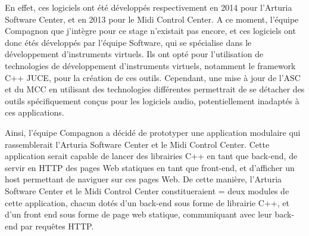\documentclass[francais]{rapportPFE}  %
\begin{document}
En effet, ces logiciels ont été développés respectivement en 2014 pour l'Arturia Software Center, et en 2013 pour le Midi Control Center. A ce moment, l'équipe Compagnon que j'intègre pour ce stage n'existait pas encore, et ces logiciels ont donc étés développés par l'équipe Software, qui se spécialise dans le développement d'instruments virtuels. Ils ont opté pour l'utilisation de technologies de développement d'instruments virtuels, notamment le framework C++ JUCE, pour la création de ces outils. Cependant, une mise à jour de l'ASC et du MCC en utilisant des technologies différentes permettrait de se détacher des outils spécifiquement conçus pour les logiciels audio, potentiellement inadaptés à ces applications.

Ainsi, l'équipe Compagnon a décidé de prototyper une application modulaire qui rassemblerait l'Arturia Software Center et le Midi Control Center. Cette application serait capable de lancer des librairies C++ en tant que back-end, de servir en HTTP des pages Web statiques en tant que front-end, et d'afficher un host permettant de naviguer sur ces pages Web. De cette manière, l'Arturia Software Center et le Midi Control Center constitueraient = deux modules de cette application, chacun dotés d'un back-end sous forme de librairie C++, et d'un front end sous forme de page web statique, communiquant avec leur back-end par requêtes HTTP.\\
\end{document}
